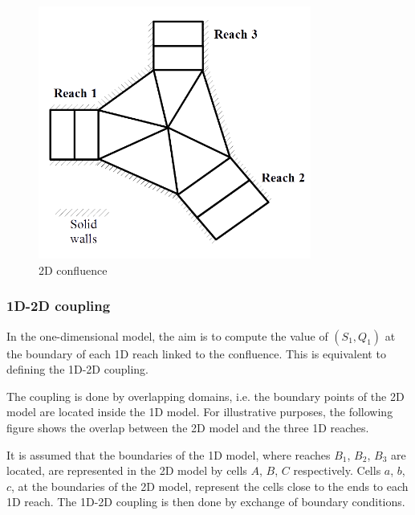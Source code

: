 \begin{figure}[H]
 \begin{center}
  \includegraphics[width=0.8\textwidth]{Figures/ConfPar.png}
  \caption{2D confluence}
 \end{center}
\end{figure}

\subsubsection{1D-2D coupling}

In the one-dimensional model, the aim is to compute the value of $(S_1,Q_1)$ at the boundary of each 1D reach linked to the confluence. This is equivalent to defining the 1D-2D coupling.

The coupling is done by overlapping domains, i.e. the boundary points of the 2D model are located inside the 1D model. For illustrative purposes, the following figure shows the overlap between the 2D model and the three 1D reaches.

It is assumed that the boundaries of the 1D model, where reaches $B_1$, $B_2$, $B_3$ are located, are represented in the 2D model by cells $A$, $B$, $C$ respectively. Cells $a$, $b$, $c$, at the boundaries of the 2D model, represent the cells close to the ends to each 1D reach. The 1D-2D coupling is then done by exchange of boundary conditions.

